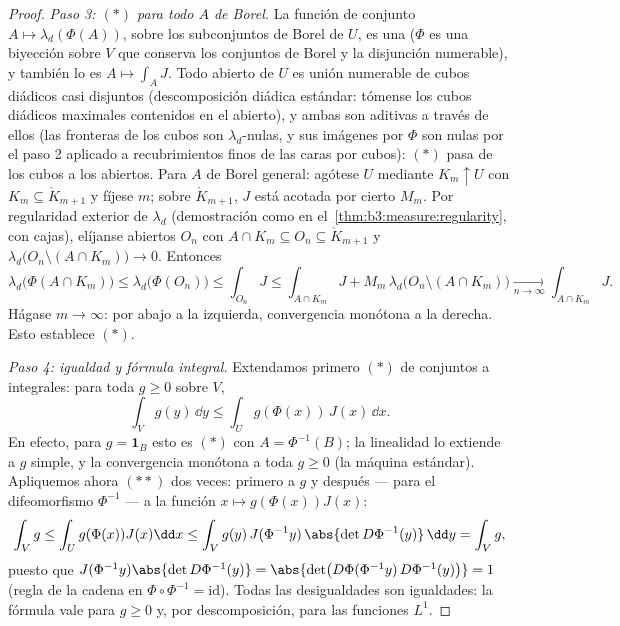 \begin{proof}
\emph{Paso 3: $(*)$ para todo $A$ de Borel.} La función de conjunto $A
\mapsto \lambda_d(\Phi(A))$, sobre los subconjuntos de Borel de $U$, es
una  ($\Phi$ es una biyección
sobre $V$ que conserva los conjuntos de Borel y la disjunción
numerable), y también lo es $A \mapsto \int_AJ$. Todo abierto de $U$ es
unión numerable de cubos diádicos
 casi disjuntos
(descomposición diádica estándar: tómense los cubos diádicos maximales
contenidos en el abierto), y ambas
 son aditivas a través de ellos
(las fronteras de los cubos son $\lambda_d$-nulas, y sus imágenes por
$\Phi$ son nulas por el paso 2 aplicado a recubrimientos finos de las
caras por cubos): $(*)$ pasa de los cubos a los
abiertos. Para $A$ de Borel general:
agótese $U$ mediante 
$K_m \uparrow U$ con $K_m \subseteq
\mathring K_{m+1}$ y fíjese $m$; sobre $\mathring K_{m+1}$, $J$ está
acotada por cierto $M_m$. Por regularidad exterior de $\lambda_d$
(demostración como en el~\cref{thm:b3:measure:regularity}, con cajas),
elíjanse abiertos $O_n$ con
$A \cap K_m \subseteq O_n
\subseteq \mathring K_{m+1}$ y $\lambda_d\bigl(O_n \setminus
(A\cap K_m)\bigr) \to 0$. Entonces
\[
\lambda_d\bigl(\Phi(A\cap K_m)\bigr) \leq
\lambda_d\bigl(\Phi(O_n)\bigr) \leq \int_{O_n}J
\leq \int_{A\cap K_m}J + M_m\,\lambda_d\bigl(O_n\setminus(A\cap
K_m)\bigr) \xrightarrow[n\to\infty]{} \int_{A\cap K_m}J .
\]
Hágase $m \to \infty$: 
por abajo a la izquierda, convergencia monótona a la derecha. Esto
establece $(*)$.

\emph{Paso 4: igualdad y fórmula integral.} Extendamos primero $(*)$ de
conjuntos a integrales: para toda $g
\geq 0$  sobre $V$,
\[
\int_V g(y)\,\dd y \leq \int_U g(\Phi(x))\,J(x)\,\dd x .
\tag{$**$}
\]
En efecto, para $g = \mathbf 1_B$ esto es $(*)$ con $A =
\Phi^{-1}(B)$; la linealidad lo extiende a $g$ simple, y la convergencia
monótona a toda $g \geq 0$ (la máquina estándar). Apliquemos ahora
$(**)$ dos veces: primero a $g$ y después --- para el difeomorfismo
$\Phi^{-1}$ --- a la función $x \mapsto g(\Phi(x))J(x)$:
\[
\int_Vg \leq \int_U g(\Phi(x))J(x)\dd x
\leq \int_V g(y)\,J(\Phi^{-1}y)\,\abs{\det
D\Phi^{-1}(y)}\,\dd y = \int_V g ,
\]
puesto que $J(\Phi^{-1}y)\abs{\det D\Phi^{-1}(y)} = \abs{\det\bigl(
D\Phi(\Phi^{-1}y)\,D\Phi^{-1}(y)\bigr)} = 1$ (regla de la cadena en
$\Phi\circ\Phi^{-1} = \mathrm{id}$). Todas las desigualdades son
igualdades: la fórmula vale para $g \geq 0$ y, por descomposición, para
las funciones $L^1$.
\end{proof}

